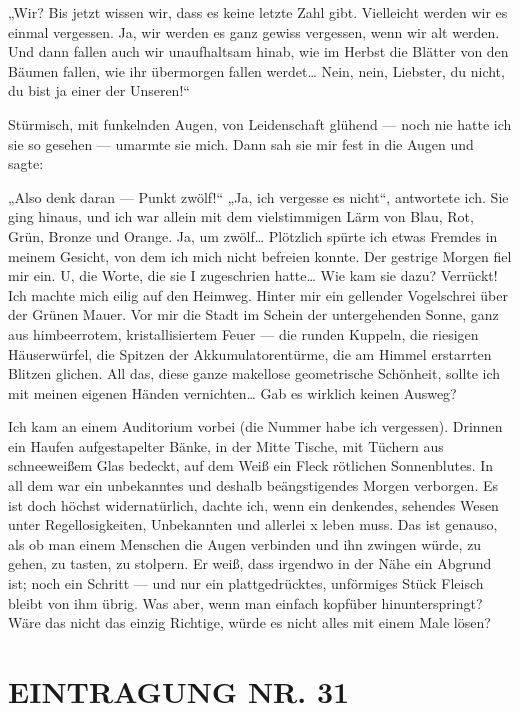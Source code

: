 „Wir? Bis jetzt wissen wir, dass es keine letzte Zahl gibt.
Vielleicht werden wir es einmal vergessen. Ja, wir werden es ganz
gewiss vergessen, wenn wir alt werden. Und dann fallen auch wir
unaufhaltsam hinab, wie im Herbst die Blätter von den Bäumen
fallen, wie ihr übermorgen fallen werdet\ldots{} Nein, nein, Liebster,
du nicht, du bist ja einer der Unseren!“

Stürmisch, mit funkelnden Augen, von Leidenschaft glühend — noch
nie hatte ich sie so gesehen — umarmte sie mich. Dann sah sie mir
fest in die Augen und sagte:

„Also denk daran — Punkt zwölf!“ „Ja, ich vergesse es nicht“,
antwortete ich. Sie ging hinaus, und ich war allein mit dem
vielstimmigen Lärm von Blau, Rot, Grün, Bronze und Orange. Ja, um
zwölf\ldots{} Plötzlich spürte ich etwas Fremdes in meinem Gesicht, von
dem ich mich nicht befreien konnte. Der gestrige Morgen fiel mir
ein. U, die Worte, die sie I zugeschrien hatte\ldots{} Wie kam sie dazu?
Verrückt! Ich machte mich eilig auf den Heimweg. Hinter mir ein
gellender Vogelschrei über der Grünen Mauer. Vor mir die Stadt im
Schein der untergehenden Sonne, ganz aus himbeerrotem,
kristallisiertem Feuer — die runden Kuppeln, die riesigen
Häuserwürfel, die Spitzen der Akkumulatorentürme, die am Himmel
erstarrten Blitzen glichen. All das, diese ganze makellose
geometrische Schönheit, sollte ich mit meinen eigenen Händen
vernichten\ldots{} Gab es wirklich keinen Ausweg?

Ich kam an einem Auditorium vorbei (die Nummer habe ich vergessen).
Drinnen ein Haufen aufgestapelter Bänke, in der Mitte Tische, mit
Tüchern aus schneeweißem Glas bedeckt, auf dem Weiß ein Fleck
rötlichen Sonnenblutes. In all dem war ein unbekanntes und deshalb
beängstigendes Morgen verborgen. Es ist doch höchst widernatürlich,
dachte ich, wenn ein denkendes, sehendes Wesen unter
Regellosigkeiten, Unbekannten und allerlei x leben muss. Das ist
genauso, als ob man einem Menschen die Augen verbinden und ihn
zwingen würde, zu gehen, zu tasten, zu stolpern. Er weiß, dass
irgendwo in der Nähe ein Abgrund ist; noch ein Schritt — und nur
ein plattgedrücktes, unförmiges Stück Fleisch bleibt von ihm übrig.
Was aber, wenn man einfach kopfüber hinunterspringt? Wäre das nicht
das einzig Richtige, würde es nicht alles mit einem Male lösen?

\section{EINTRAGUNG NR. 31}

